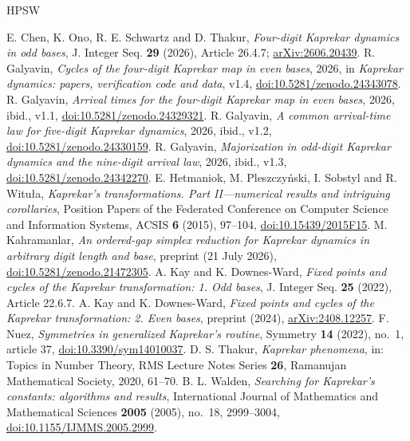 \documentclass[11pt,reqno]{amsart}
\begin{document}
\begin{thebibliography}{HPSW}
\raggedright
{} E. Chen, K. Ono, R. E. Schwartz and D. Thakur,
\emph{Four-digit Kaprekar dynamics in odd bases}, J. Integer Seq. \textbf{29}
(2026), Article 26.4.7; \href{https://arxiv.org/abs/2606.20439}{arXiv:2606.20439}.
 R. Galyavin, \emph{Cycles of the four-digit Kaprekar map in
even bases}, 2026, in \emph{Kaprekar dynamics: papers, verification code
and data}, v1.4, \href{https://doi.org/10.5281/zenodo.24343078}{doi:10.5281/zenodo.24343078}.
 R. Galyavin, \emph{Arrival times for the four-digit Kaprekar
map in even bases}, 2026, ibid., v1.1,
\href{https://doi.org/10.5281/zenodo.24329321}{doi:10.5281/zenodo.24329321}.
 R. Galyavin, \emph{A common arrival-time law for five-digit
Kaprekar dynamics}, 2026, ibid., v1.2,
\href{https://doi.org/10.5281/zenodo.24330159}{doi:10.5281/zenodo.24330159}.
 R. Galyavin, \emph{Majorization in odd-digit Kaprekar
dynamics and the nine-digit arrival law}, 2026, ibid., v1.3,
\href{https://doi.org/10.5281/zenodo.24342270}{doi:10.5281/zenodo.24342270}.
 E. Hetmaniok, M. Pleszczy\'nski, I. Sobstyl and
R. Witu{\l}a, \emph{Kaprekar's transformations. Part II---numerical results
and intriguing corollaries}, Position Papers of the Federated Conference on
Computer Science and Information Systems, ACSIS \textbf{6} (2015), 97--104,
\href{https://doi.org/10.15439/2015F15}{doi:10.15439/2015F15}.
 M. Kahramanlar, \emph{An ordered-gap simplex reduction
for Kaprekar dynamics in arbitrary digit length and base}, preprint (21 July
2026), \href{https://doi.org/10.5281/zenodo.21472305}{doi:10.5281/zenodo.21472305}.
 A. Kay and K. Downes-Ward, \emph{Fixed points and cycles
of the Kaprekar transformation: 1. Odd bases}, J. Integer Seq. \textbf{25}
(2022), Article 22.6.7.
 A. Kay and K. Downes-Ward, \emph{Fixed points and cycles
of the Kaprekar transformation: 2. Even bases}, preprint (2024),
\href{https://arxiv.org/abs/2408.12257}{arXiv:2408.12257}.
 F. Nuez, \emph{Symmetries in generalized Kaprekar's
routine}, Symmetry \textbf{14} (2022), no.~1, article 37,
\href{https://doi.org/10.3390/sym14010037}{doi:10.3390/sym14010037}.
 D. S. Thakur, \emph{Kaprekar phenomena}, in: Topics in
Number Theory, RMS Lecture Notes Series \textbf{26}, Ramanujan Mathematical
Society, 2020, 61--70.
 B. L. Walden, \emph{Searching for Kaprekar's constants:
algorithms and results}, International Journal of Mathematics and
Mathematical Sciences \textbf{2005} (2005), no.~18, 2999--3004,
\href{https://doi.org/10.1155/IJMMS.2005.2999}{doi:10.1155/IJMMS.2005.2999}.
\end{thebibliography}
\end{document}
